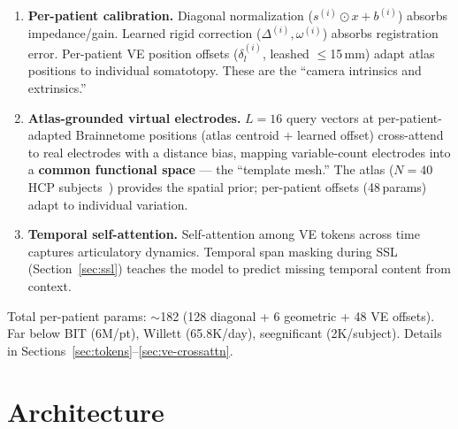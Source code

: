 \documentclass[11pt,letterpaper]{article}
\begin{document}
\begin{enumerate}[leftmargin=2em]
\item \textbf{Per-patient calibration.} Diagonal normalization ($s^{(i)} \odot x + b^{(i)}$) absorbs impedance/gain. Learned rigid correction ($\Delta^{(i)}, \omega^{(i)}$) absorbs registration error. Per-patient VE position offsets ($\delta_l^{(i)}$, leashed $\leq$15\,mm) adapt atlas positions to individual somatotopy. These are the ``camera intrinsics and extrinsics.''

\item \textbf{Atlas-grounded virtual electrodes.} $L{=}16$ query vectors at per-patient-adapted Brainnetome positions (atlas centroid + learned offset) cross-attend to real electrodes with a distance bias, mapping variable-count electrodes into a \textbf{common functional space} --- the ``template mesh.'' The atlas ($N{=}40$ HCP subjects~\cite{fan2016}) provides the spatial prior; per-patient offsets (48\,params) adapt to individual variation.

\item \textbf{Temporal self-attention.} Self-attention among VE tokens across time captures articulatory dynamics. Temporal span masking during SSL (Section~\ref{sec:ssl}) teaches the model to predict missing temporal content from context.
\end{enumerate}

Total per-patient params: ${\sim}$182 (128 diagonal + 6 geometric + 48 VE offsets). Far below BIT (6M/pt), Willett (65.8K/day), seegnificant (2K/subject). Details in Sections~\ref{sec:tokens}--\ref{sec:ve-crossattn}.



\section{Architecture}\label{sec:architecture}
\end{document}
